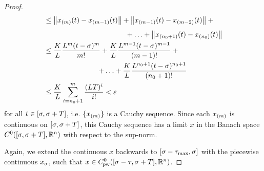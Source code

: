 \begin{proof}
\begin{align*}
            &\leq \!\begin{multlined}[t][0.55\displaywidth]
                \nnorm*{\seq{x}{m}(t)-\seq{x}{m-1}(t)} + \nnorm*{\seq{x}{m-1}(t)-\seq{x}{m-2}(t)} + {}\\[0.5em]
                +\ldots+\nnorm*{\seq{x}{n_0+1}(t)-\seq{x}{n_0}(t)}
            \end{multlined}\\
            &\leq \!\begin{multlined}[t][0.6\displaywidth]
                \frac{K}{L}\frac{L^m (t-\tzero)^m}{m!} + \frac{K}{L}\frac{L^{m-1} (t-\tzero)^{m-1}}{(m-1)!} + {}\\
                +\ldots+\frac{K}{L}\frac{L^{n_0+1} (t-\tzero)^{n_0+1}}{(n_0+1)!}
            \end{multlined}\\
            &\leq \frac{K}{L}\sum_{i=n_0+1}^m \frac{(LT)^i}{i!} < \varepsilon
        \end{align*}
        for all $t\in [\sigma,\sigma+T]$, i.e. $\{x_{(m)}\}$ is a Cauchy sequence.
        Since each $x_{(m)}$ is continuous on $[\sigma,\sigma+T]$, this Cauchy sequence has a limit $x$ in the Banach space $\Cn[0]{\compactum{\tzero}{\tzero+T}}{\R^n}$ with respect to the sup-norm.

        Again, we extend the continuous $x$ backwards to $[\sigma-\tau_{\max},\sigma]$ with the piecewise continuous $x_\sigma$, such that $x\in\Cnpw[0]{\compactum{\tzero-\tau}{\tzero+T}}{\R^n}$.


\end{proof}
